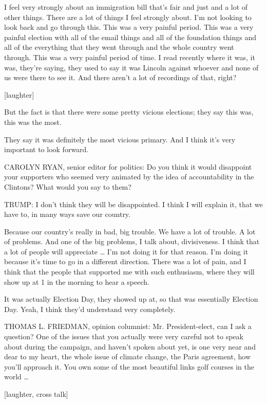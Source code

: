 I feel very strongly about an immigration bill that's fair and just and
a lot of other things. There are a lot of things I feel strongly about.
I'm not looking to look back and go through this. This was a very
painful period. This was a very painful election with all of the email
things and all of the foundation things and all of the everything that
they went through and the whole country went through. This was a very
painful period of time. I read recently where it was, it was, they're
saying, they used to say it was Lincoln against whoever and none of us
were there to see it. And there aren't a lot of recordings of that,
right?

{[}laughter{]}

But the fact is that there were some pretty vicious elections; they say
this was, this was the most.

They say it was definitely the most vicious primary. And I think it's
very important to look forward.

CAROLYN RYAN, senior editor for politics: Do you think it would
disappoint your supporters who seemed very animated by the idea of
accountability in the Clintons? What would you say to them?

TRUMP: I don't think they will be disappointed. I think I will explain
it, that we have to, in many ways save our country.

Because our country's really in bad, big trouble. We have a lot of
trouble. A lot of problems. And one of the big problems, I talk about,
divisiveness. I think that a lot of people will appreciate \ldots{} I'm
not doing it for that reason. I'm doing it because it's time to go in a
different direction. There was a lot of pain, and I think that the
people that supported me with such enthusiasm, where they will show up
at 1 in the morning to hear a speech.

It was actually Election Day, they showed up at, so that was essentially
Election Day. Yeah, I think they'd understand very completely.

THOMAS L. FRIEDMAN, opinion columnist: Mr. President-elect, can I ask a
question? One of the issues that you actually were very careful not to
speak about during the campaign, and haven't spoken about yet, is one
very near and dear to my heart, the whole issue of climate change, the
Paris agreement, how you'll approach it. You own some of the most
beautiful links golf courses in the world \ldots{}

{[}laughter, cross talk{]}

